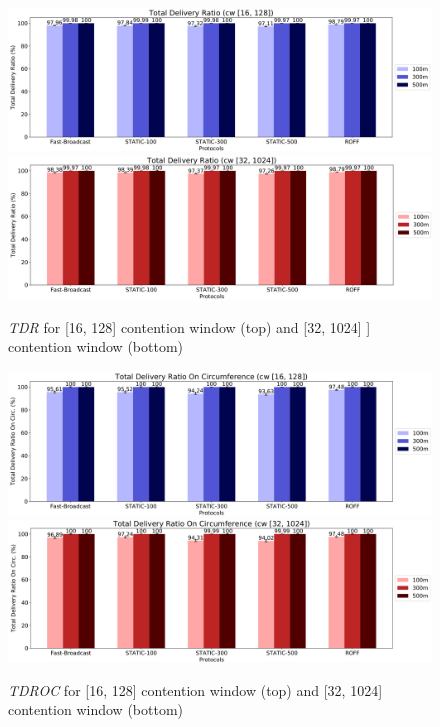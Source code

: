 		\begin{figure}[H]
			\centering
			\includegraphics[width=1.0\textwidth]{immagini/la-25/cw/16/tdr}
			\includegraphics[width=1.0\textwidth]{immagini/la-25/cw/32/tdr}
			\caption{\textit{TDR} for [16, 128] contention window (top) and [32, 1024] ] contention window (bottom)}
			\label{fig:la-cw-tdr}
		\end{figure}
	
		\begin{figure}[H]
			\centering
			\includegraphics[width=1.0\textwidth]{immagini/la-25/cw/16/tdroc}
			\includegraphics[width=1.0\textwidth]{immagini/la-25/cw/32/tdroc}
			\caption{\textit{TDROC} for [16, 128] contention window (top) and [32, 1024] contention window (bottom)}
			\label{fig:la-cw-tdroc}
		\end{figure}
	
